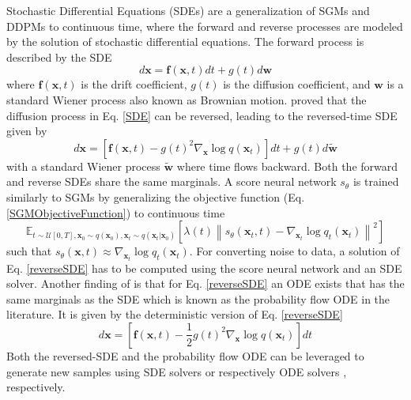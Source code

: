 Stochastic Differential Equations (\gls{SDE}s) \cite{SDE} are a generalization of \gls{SGM}s and \gls{DDPM}s to continuous time, where the forward and reverse processes are modeled by the solution of stochastic differential equations. The forward process is described by the \gls{SDE}
\begin{equation}
    d\mathbf{x} = \mathbf{f}(\mathbf{x},t) dt + g(t) d\mathbf{w}
    \label{SDE}
\end{equation}
where $\mathbf{f}(\mathbf{x},t)$ is the drift coefficient, $g(t)$ is the diffusion coefficient, and $\mathbf{w}$ is a standard Wiener process also known as Brownian motion. \cite{Anderson} proved that the diffusion process in Eq. \ref{SDE} can be reversed, leading to the reversed-time \gls{SDE} given by 
\begin{equation}
    d\mathbf{x} = \left[ \mathbf{f}(\mathbf{x},t) -  g(t)^2 \nabla_\mathbf{x} \log q(\mathbf{x}_t) \right] dt + g(t) d\mathbf{\tilde{w}}
    \label{reverseSDE}
\end{equation}
with a standard Wiener process $\mathbf{\tilde{w}}$ where time flows backward. Both the forward and reverse \gls{SDE}s share the same marginals. A score neural network $s_\theta$ is trained similarly to \gls{SGM}s by generalizing the objective function (Eq. \ref{SGMObjectiveFunction}) to continuous time 
\begin{equation}
    \mathbb{E}_{t \sim \mathcal{U}[0,T], \mathbf{x}_0 \sim q(\mathbf{x}_0), \mathbf{x}_t \sim q(\mathbf{x}_t|\mathbf{x}_0)} \left[ \lambda(t) \left\| s_\theta(\mathbf{x}_t, t) - \nabla_{\mathbf{x}_t} \log q_{t}(\mathbf{x}_t) \right\|^2 \right]
\end{equation}
such that $s_\theta(\mathbf{x},t) \approx \nabla_{\mathbf{x}_t} \log q_{t}(\mathbf{x}_t) $. For converting noise to data, a solution of Eq. \ref{reverseSDE} has to be computed using the score neural network and an \gls{SDE} solver. Another finding of \cite{SDE} is that for Eq. \ref{reverseSDE} an \gls{ODE} exists that has the same marginals as the \gls{SDE} which is known as the probability flow \gls{ODE} in the literature. It is given by the deterministic version of Eq. \ref{reverseSDE}
\begin{equation}
    d\mathbf{x} = \left[ \mathbf{f}(\mathbf{x},t) - \frac{1}{2} g(t)^2 \nabla_\mathbf{x} \log q(\mathbf{x}_t) \right] dt
\end{equation}
Both the reversed-\gls{SDE} and the probability flow \gls{ODE} can be leveraged to generate new samples using \gls{SDE} solvers \cite{SDE, FastSDE} or respectively \gls{ODE} solvers \cite{SDE, ODESolver1, ODESolver2, ODESolver3}, respectively.




